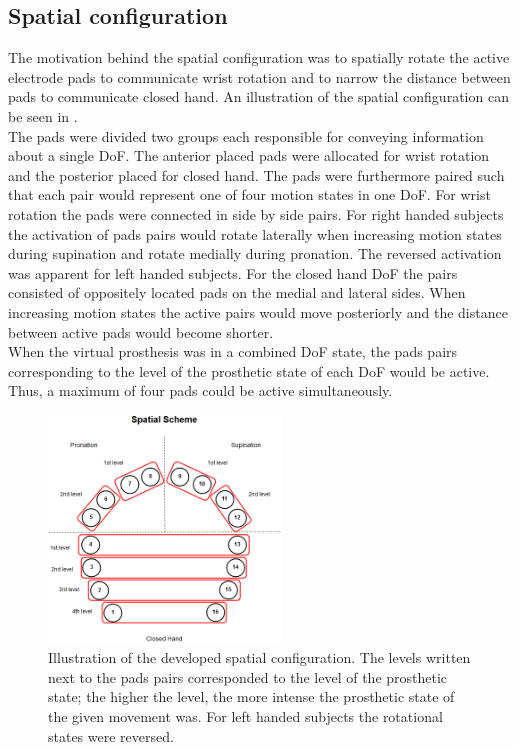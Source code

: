 \subsection{Spatial configuration}
The motivation behind the spatial configuration was to spatially rotate the active electrode pads to communicate wrist rotation and to narrow the distance between pads to communicate closed hand. An illustration of the spatial configuration can be seen in . \\
The pads were divided two groups each responsible for conveying information about a single DoF. The anterior placed pads were allocated for wrist rotation and the posterior placed for closed hand. The pads were furthermore paired such that each pair would represent one of four motion states in one DoF. For wrist rotation the pads were connected in side by side pairs. For right handed subjects the activation of pads pairs would rotate laterally when increasing motion states during supination and rotate medially during pronation. The reversed activation was apparent for left handed subjects. For the closed hand DoF the pairs consisted of oppositely located pads on the medial and lateral sides. When increasing motion states the active pairs would move posteriorly and the distance between active pads would become shorter. \\
When the virtual prosthesis was in a combined DoF state, the pads pairs corresponding to the level of the prosthetic state of each DoF would be active. Thus, a maximum of four pads could be active simultaneously. 

\begin{figure}[H]                 
	\includegraphics[width=0.55\textwidth]{figures/El_array_spatial}  
	\caption{Illustration of the developed spatial configuration. The levels written next to the pads pairs corresponded to the level of the prosthetic state; the higher the level, the more intense the prosthetic state of the given movement was. For left handed subjects the rotational states were reversed.}
	\label{fig:pa:spatial} 
\end{figure}

